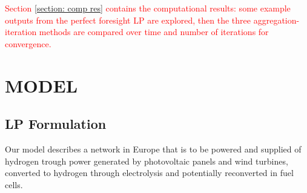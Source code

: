 \textcolor{red}{
  Section \ref{section: comp res} contains the computational results: some example outputs from the perfect foresight LP are explored, then the three aggregation-iteration methods are compared over time and number of iterations for convergence.
}











\section{MODEL}\label{section: model}

\subsection{LP Formulation}\label{subsection: LP}
Our model describes a network in Europe that is to be powered and supplied of hydrogen trough power generated by photovoltaic panels and wind turbines, converted to hydrogen through electrolysis and potentially reconverted in fuel cells.

